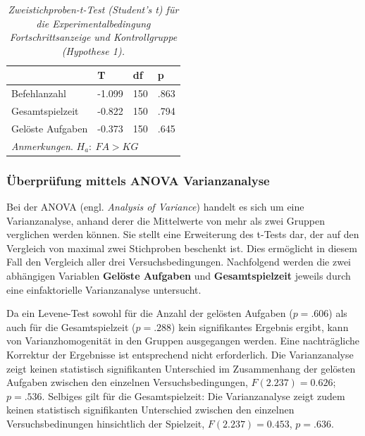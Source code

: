 \begin{table}[htbp]
\centering
\caption{\textit{Zweistichproben-t-Test (Student's t) für die Experimentalbedingung Fortschrittsanzeige und Kontrollgruppe (Hypothese 1).}}
\begin{tabular}{  p{4cm} p{2.0cm} p{2.0cm} p{2.0cm}  }
 \hline
 & T &df & p \\
 \hline
  Befehlanzahl       & -1.099   &   150 & .863\\
  Gesamtspielzeit    & -0.822   &   150 & .794\\
  Gelöste Aufgaben   & -0.373   &   150 & .645\\
 \hline
 \multicolumn{4}{l}{%
 \small%
\textit{Anmerkungen}. $H_a:\: FA > KG$
}\\
\end{tabular}
\label{ttest_hypo_2}
\end{table}





\subsubsection{Überprüfung mittels ANOVA Varianzanalyse }
Bei der ANOVA (engl. \textit{Analysis of Variance}) handelt es sich um eine Varianzanalyse, anhand derer die Mittelwerte von mehr als zwei Gruppen verglichen werden können. Sie stellt eine Erweiterung des t-Tests dar, der auf den Vergleich von maximal zwei Stichproben beschenkt ist. Dies ermöglicht in diesem Fall den Vergleich aller drei Versuchsbedingungen. Nachfolgend werden die zwei abhängigen Variablen \textbf{Gelöste Aufgaben} und \textbf{Gesamtspielzeit} jeweils durch eine einfaktorielle Varianzanalyse untersucht.

Da ein Levene-Test sowohl für die Anzahl der gelösten Aufgaben ($p = .606$) als auch für die Gesamtspielzeit ($p = .288$) kein signifikantes Ergebnis ergibt, kann von Varianzhomogenität in den Gruppen ausgegangen werden. Eine nachträgliche Korrektur der Ergebnisse ist entsprechend nicht erforderlich. Die Varianzanalyse zeigt keinen statistisch signifikanten Unterschied im Zusammenhang der gelösten Aufgaben zwischen den einzelnen Versuchsbedingungen, $F (2.237) = 0.626$; $p = .536$. Selbiges gilt für die Gesamtspielzeit: Die Varianzanalyse zeigt zudem keinen statistisch  signifikanten Unterschied zwischen den einzelnen Versuchsbedinungen hinsichtlich der Spielzeit,  $F(2.237) = 0.453$, $p = .636$.



